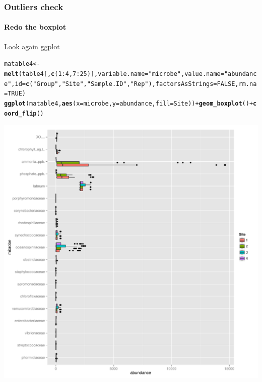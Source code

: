 \documentclass[10pt,handout,english]{beamer}\usepackage[]{graphicx}\usepackage[]{color}
\makeatletter
\newcommand{\hlnum}[1]{\textcolor[rgb]{0.686,0.059,0.569}{#1}}%
\newcommand{\hlstr}[1]{\textcolor[rgb]{0.192,0.494,0.8}{#1}}%
\newcommand{\hlopt}[1]{\textcolor[rgb]{0,0,0}{#1}}%
\newcommand{\hlstd}[1]{\textcolor[rgb]{0.345,0.345,0.345}{#1}}%
\newcommand{\hlkwb}[1]{\textcolor[rgb]{0.69,0.353,0.396}{#1}}%
\newcommand{\hlkwc}[1]{\textcolor[rgb]{0.333,0.667,0.333}{#1}}%
\newcommand{\hlkwd}[1]{\textcolor[rgb]{0.737,0.353,0.396}{\textbf{#1}}}%
\newenvironment{kframe}{%
 \def\at@end@of@kframe{}%
 \ifinner\ifhmode%
  \def\at@end@of@kframe{\end{minipage}}%
  \begin{minipage}{\columnwidth}%
 \fi\fi%
 \def\FrameCommand##1{\hskip\@totalleftmargin \hskip-\fboxsep
 \colorbox{shadecolor}{##1}\hskip-\fboxsep
     \hskip-\linewidth \hskip-\@totalleftmargin \hskip\columnwidth}%
 \MakeFramed {\advance\hsize-\width
   \@totalleftmargin\z@ \linewidth\hsize
   \@setminipage}}%
 {\par\unskip\endMakeFramed%
 \at@end@of@kframe}
\newenvironment{knitrout}{}{} %
\makeatother
\begin{document}
\begin{frame}[fragile]
  \frametitle{Outliers check}
  \framesubtitle{ Redo the boxplot}
  \begin{block}{Look again ggplot}
  \end{block}

\begin{knitrout}
\color{fgcolor}\begin{kframe}
\begin{alltt}
\hlstd{matable4}\hlkwb{<-}\hlkwd{melt}\hlstd{(table4[,}\hlkwd{c}\hlstd{(}\hlnum{1}\hlopt{:}\hlnum{4}\hlstd{,}\hlnum{7}\hlopt{:}\hlnum{25}\hlstd{)],}\hlkwc{variable.name} \hlstd{=} \hlstr{"microbe"}\hlstd{,}\hlkwc{value.name} \hlstd{=}\hlstr{"abundance"}\hlstd{,}  \hlkwc{id}\hlstd{=}\hlkwd{c}\hlstd{(}\hlstr{"Group"}\hlstd{,}\hlstr{"Site"}\hlstd{,}\hlstr{"Sample.ID"}\hlstd{,}\hlstr{"Rep"}\hlstd{),}\hlkwc{factorsAsStrings}\hlstd{=}\hlnum{FALSE}\hlstd{,}\hlkwc{rm.na}\hlstd{=}\hlnum{TRUE}\hlstd{)}
\hlkwd{ggplot}\hlstd{(matable4,}\hlkwd{aes}\hlstd{(}\hlkwc{x}\hlstd{=microbe,}\hlkwc{y}\hlstd{=abundance,}\hlkwc{fill}\hlstd{=Site))} \hlopt{+} \hlkwd{geom_boxplot}\hlstd{()} \hlopt{+}  \hlkwd{coord_flip}\hlstd{()}
\end{alltt}


{\ttfamily\noindent\color{warningcolor}{\#\# Warning: Removed 24 rows containing non-finite values (stat\_boxplot).}}\end{kframe}
\includegraphics[width=.85\linewidth]{figure/chunk10viii-1} 

\end{knitrout}

\end{frame} 
\end{document}
